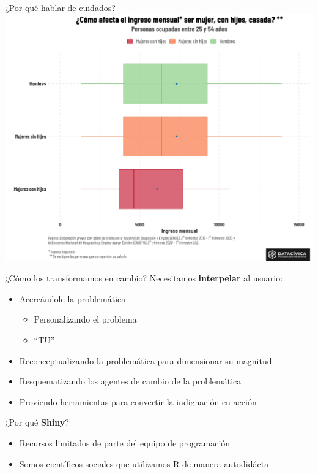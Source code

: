 \documentclass[
  ignorenonframetext,
]{beamer}
\providecommand{\tightlist}{%
  \setlength{\itemsep}{0pt}\setlength{\parskip}{0pt}}
\begin{document}
\begin{frame}{¿Por qué hablar de cuidados?}
\protect\hypertarget{por-quuxe9-hablar-de-cuidados-1}{}
\includegraphics[width=41.67in]{img/boxplot}
\end{frame}

\begin{frame}{¿Cómo los transformamos en cambio?}
\protect\hypertarget{cuxf3mo-los-transformamos-en-cambio}{}
Necesitamos \textbf{interpelar} al usuario:

\begin{itemize}
\tightlist
\item
  Acercándole la problemática

  \begin{itemize}
  \tightlist
  \item
    Personalizando el problema
  \item
    ``TU''
  \end{itemize}
\item
  Reconceptualizando la problemática para dimensionar su magnitud
\item
  Resquematizando los agentes de cambio de la problemática
\item
  Proviendo herramientas para convertir la indignación en acción
\end{itemize}
\end{frame}

\begin{frame}{¿Por qué \textbf{Shiny}?}
\protect\hypertarget{por-quuxe9-shiny}{}
\begin{itemize}
\tightlist
\item
  Recursos limitados de parte del equipo de programación
\item
  Somos científicos sociales que utilizamos R de manera autodidácta
\end{itemize}
\end{frame}
\end{document}
